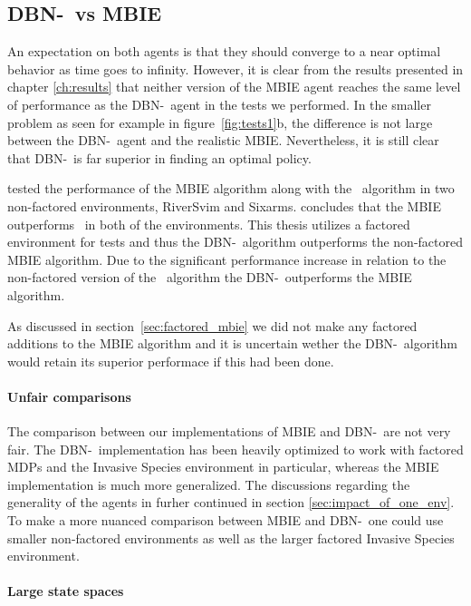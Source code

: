 \subsection{DBN-\etre\ vs MBIE}
\label{sec:dbn_vs_mbie}

An expectation on both agents is that they should converge to a near optimal
behavior as time goes to infinity. However, it is clear from the results
presented in chapter \ref{ch:results} that neither version of the MBIE agent
reaches the same level of performance as the DBN-\etre\ agent in the tests we
performed. In the smaller problem as seen for example in
figure~\ref{fig:tests1}b, the difference is not large between the DBN-\etre\ agent
and the realistic MBIE. Nevertheless, it is still clear that DBN-\etre\ is far
superior in finding an optimal policy.

\textcite{strehl2004empirical} tested the performance of the MBIE algorithm
along with the \etre\ algorithm in two non-factored environments, RiverSvim and
Sixarms. \textcite{strehl2004empirical} concludes that the MBIE outperforms
\etre\ in both of the environments. This thesis utilizes a factored environment
for tests and thus the DBN-\etre\ algorithm outperforms the non-factored MBIE
algorithm. Due to the significant performance increase in relation to the
non-factored version of the \etre\ algorithm the DBN-\etre\ outperforms the
MBIE algorithm.

As discussed in section~\ref{sec:factored_mbie} we did not make any factored
additions to the MBIE algorithm and it is uncertain wether the DBN-\etre\
algorithm would retain its superior performace if this had been done.

\paragraph{Unfair comparisons}

The comparison between our implementations of MBIE and DBN-\etre\ are not very
fair. The DBN-\etre\ implementation has been heavily optimized to work with
factored MDPs and the Invasive Species environment in particular, whereas the
MBIE implementation is much more generalized. The discussions regarding the
generality of the agents in furher continued in section
\ref{sec:impact_of_one_env}. To make a more nuanced comparison between MBIE and
DBN-\etre\ one could use smaller non-factored environments as well as the
larger factored Invasive Species environment.


\paragraph{Large state spaces}

